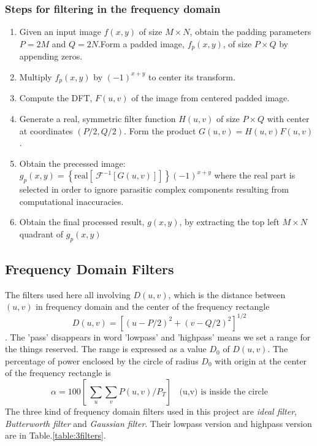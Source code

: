 \subsubsection{Steps for filtering in the frequency domain}
\begin{enumerate}
	\item Given an input image $f(x,y)$ of size $M\times N$, obtain the padding parameters $P=2M$ and $Q=2N$.Form a padded image, $f_p(x,y)$, of size $P\times Q$ by appending zeros.
	\item Multiply $f_p(x,y)$ by $(-1)^{x+y}$ to center its transform.
	\item Compute the DFT, $F(u,v)$ of the image from centered padded image.
	\item Generate a real, symmetric filter function $H(u,v)$ of size $P \times Q$ with center at coordinates $(P/2, Q/2)$. Form the product $G(u,v)=H(u,v)F(u,v)$.
	\item Obtain the precessed image: $g_p(x,y)=\left\{ \text{real}\left[\ \mathcal{F}^{-1}[G(u,v)] \right] \right\}(-1)^{x+y}$ where the real part is selected in order to ignore parasitic complex components resulting from computational inaccuracies.
	\item Obtain the final processed result, $g(x,y)$, by extracting the top left $M\times N$ quadrant of $g_p(x,y)$
\end{enumerate}


\subsection{Frequency Domain Filters}
The filters used here all involving $D(u,v)$, which is the distance between $(u,v)$ in frequency domain and the center of the frequency rectangle \begin{equation} D(u,v) = \left[ (u-P/2)^2+(v-Q/2)^2 \right]^{1/2} \end{equation}. The 'pass' disappears in word 'lowpass' and 'highpass' means we set a range for the things reserved. The range is expressed as a value $D_0$ of $D(u,v)$. The percentage of power enclosed by the circle of radius $D_0$ with origin at the center of the frequency rectangle is \begin{equation} \alpha=100\left[\ \sum_u\sum_vP(u,v)/P_T \right] ~~~~ \text{(u,v) is inside the circle}\end{equation}
The three kind of frequency domain filters used in this project are \emph{ideal filter}, \emph{Butterworth filter} and \emph{Gaussian filter}. Their lowpass version and highpass version are in Table.\ref{table:3filters}. \\

